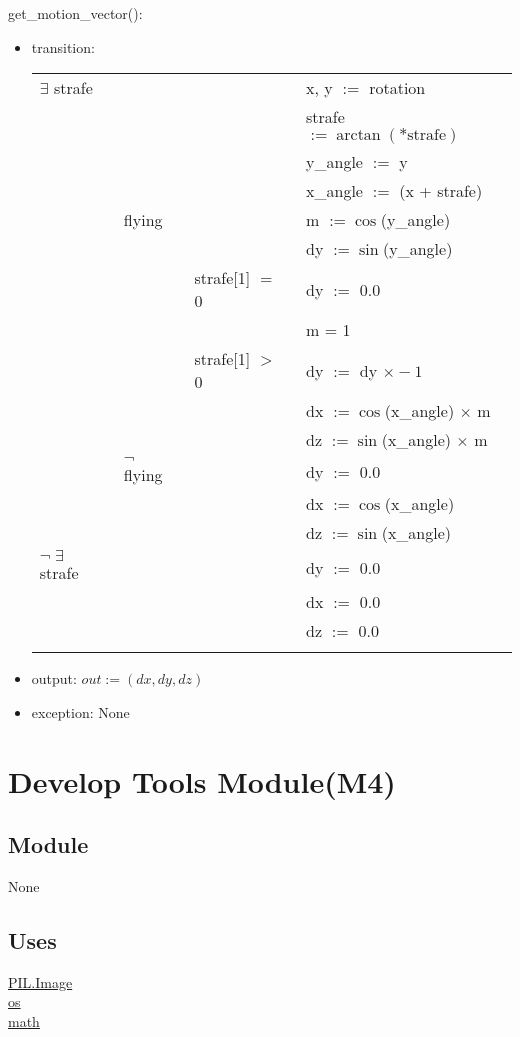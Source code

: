 \documentclass{article}
\begin{document}
\noindent get\_motion\_vector():
\begin{itemize}
\item transition: 

\begin{tabular}{|l|l|l|l|}
\hhline{|-|-|-|-|}
$\exists$ strafe &&& x, y $:=$ rotation\\
 &&& strafe $:= \arctan(\text{*strafe})$\\
 &&& y\_angle $:=$ y\\
 &&& x\_angle $:=$ (x + strafe)\\
\hhline{|~|-|-|-|}
 & flying && m $:= \cos$(y\_angle)\\
 & && dy $:= \sin$(y\_angle)\\
\hhline{|~|~|-|-|}
 & & strafe[1] $=$ 0 & dy $:=$ 0.0\\
 & & & m = 1\\
\hhline{|~|~|-|-|}
 & & strafe[1] $>$ 0 & dy $:=$ dy $\times -1$\\
 & & & dx $:= \cos$(x\_angle) $\times$ m\\
 & & & dz $:= \sin$(x\_angle) $\times$ m\\
\hhline{|~|-|-|-|}
 & $\neg$ flying && dy $:=$ 0.0\\
 & && dx $:= \cos$(x\_angle)\\
 & && dz $:= \sin$(x\_angle)\\
\hhline{|-|-|-|-|}
 $\neg \; \exists$ strafe &&& dy $:=$ 0.0\\
 &&& dx $:=$ 0.0\\
 &&& dz $:=$ 0.0\\
\hhline{|-|-|-|-|}
\end{tabular}

\item output: $out := (dx, dy, dz)$
\item exception: None
\end{itemize}\vspace{6mm}

\newpage


\section {Develop Tools Module(M4)}

\subsection{Module}
None

\subsection {Uses}
\href{https://pillow.readthedocs.io/en/stable/reference/Image.html}{PIL.Image}\\
\href{https://docs.python.org/3/library/os.html}{os} \\
\href{https://docs.python.org/3/library/math.html}{math}
\end{document}
